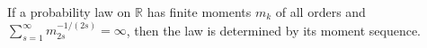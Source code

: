If a probability law on \(\mathbb R\) has finite moments \(m_k\) of all orders and \(\sum_{s=1}^{\infty}m_{2s}^{-1/(2s)}=\infty\), then the law is determined by its moment sequence.
